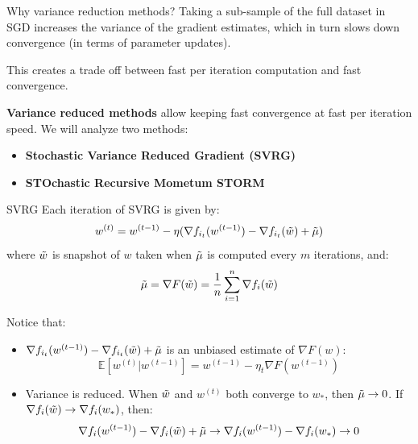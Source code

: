 \documentclass[10pt]{beamer}
\begin{document}
\begin{frame}{Why variance reduction methods?}
    Taking a sub-sample of the full dataset in SGD increases the variance of the gradient estimates, which in turn slows down convergence (in terms of parameter updates). 
    
    \vspace{5mm}
    This creates a trade off between fast per iteration computation and fast convergence.
    
    \vspace{5mm}
    \textbf{Variance reduced methods} allow keeping fast convergence at fast per iteration speed. We will analyze two methods:
    \begin{itemize}
        \item \textbf{Stochastic Variance Reduced Gradient (SVRG)}
        \item \textbf{STOchastic Recursive Mometum STORM}
    \end{itemize}
    
\end{frame}

\begin{frame}{SVRG}
    Each iteration of SVRG is given by:
    $$w^{(t)} = w^{(t-1)} -\eta(\nabla f_{i_t}(w^{(t-1)}) - \nabla f_{i_t}(\Tilde{w}) + \Tilde{\mu})$$
    where $\Tilde{w}$ is snapshot of $w$ taken when $\Tilde{\mu}$ is computed every $m$ iterations, and:
    $$\Tilde{\mu} = \nabla F(\Tilde{w}) = \frac{1}{n}\sum_{i=1}^n \nabla f_i(\Tilde{w})$$
    
    Notice that: 
    \begin{itemize}
        \item $\nabla f_{i_t}(w^{(t-1)}) - \nabla f_{i_t}(\Tilde{w}) + \Tilde{\mu}$ is an unbiased estimate of $\nabla F(w)$:
    $$\mathbb{E}[w^{(t)} | w^{(t-1)}] = w^{(t-1)}-\eta_t \nabla F(w^{(t-1)})$$
        \item Variance is reduced. When $\Tilde{w}$ and $w^{(t)}$ both converge to $w_{\ast}$, then $\Tilde{\mu} \rightarrow 0$. If $\nabla f_i(\Tilde{w}) \rightarrow \nabla f_i(w_{\ast})$, then:
        $$\nabla f_i(w^{(t-1)}) - \nabla f_i(\Tilde{w}) + \Tilde{\mu} \rightarrow \nabla f_i(w^{(t-1)}) - \nabla f_i(w_{\ast}) \rightarrow 0$$
    \end{itemize}
\end{frame}
\end{document}
